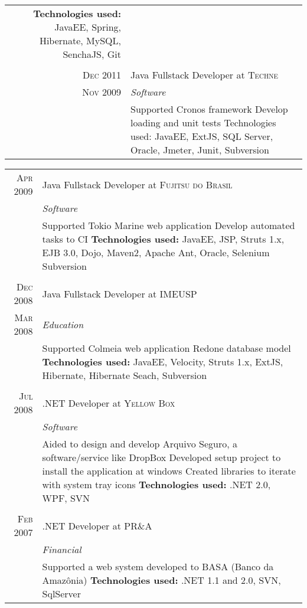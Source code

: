 \documentclass[a4paper,10pt]{article}
\begin{document}
\begin{tabular}{r|p{11cm}}
{\textbf{Technologies used:} JavaEE, Spring, Hibernate, MySQL, SenchaJS, Git
 }\\\multicolumn{2}{c}{} \\
\textsc{Dec 2011} & Java Fullstack Developer at \textsc{Techne} \\\textsc{Nov 2009}&\emph{Software}\\&\footnotesize{  Supported Cronos framework\newline
                          Develop loading and unit tests \newline
Technologies used: JavaEE, ExtJS, SQL Server, Oracle, Jmeter, Junit, Subversion
 }

 
 \end{tabular}
 \newpage
\begin{tabular}{r|p{11cm}}
\textsc{Apr 2009} & Java Fullstack Developer at \textsc{Fujitsu do Brasil} \\&\emph{Software}\\&\footnotesize{  Supported Tokio Marine web application
                          Develop automated tasks to CI \newline
\textbf{Technologies used:} JavaEE, JSP, Struts 1.x, EJB 3.0, Dojo, Maven2, Apache Ant, Oracle, Selenium Subversion
 }\\\multicolumn{2}{c}{} \\ 
 \textsc{Dec 2008} & Java Fullstack Developer at \textsc{IMEUSP} \\\textsc{Mar 2008} &\emph{Education}\\&\footnotesize{ Supported Colmeia web application
                          Redone database model\newline
\textbf{Technologies used:} JavaEE, Velocity, Struts 1.x, ExtJS, Hibernate, Hibernate Seach, Subversion
 }\\\multicolumn{2}{c}{} \\
 
\textsc{Jul 2008} & .NET Developer at \textsc{Yellow Box} \\&\emph{Software}\\&\footnotesize{ Aided to design and develop Arquivo Seguro, a software/service like DropBox\newline
   Developed setup project to install the application at windows\newline
   Created libraries to iterate with system tray icons\newline
\textbf{Technologies used:} .NET 2.0, WPF, SVN
 }\\\multicolumn{2}{c}{} \\
 \textsc{Feb 2007} & .NET Developer at \textsc{PR\&A} \\&\emph{Financial}\\&\footnotesize{  Supported a web system developed to BASA (Banco da Amazônia) \newline
\textbf{Technologies used:} .NET 1.1 and 2.0, SVN, SqlServer
 }
\end{tabular}
\end{document}
